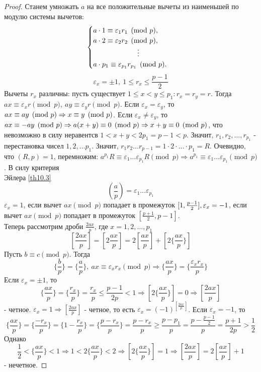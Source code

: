 \documentclass[a4paper, 12pt]{article}
\renewcommand{\epsilon}{\varepsilon}
\newcommand\tab[1][.5cm]{\hspace*{#1}}
\theoremstyle{definition}
\begin{document}
    \begin{proof}
        Станем умножать $a$ на все положительные вычеты из наименьшей по модулю системы вычетов:\\
        \[\begin{cases}
            a\cdot 1\equiv \epsilon_1 r_1\pmod{p},\\
            a\cdot 2\equiv \epsilon_2 r_2\pmod{p},\\
            \tab[2.2cm]\vdots\\
            a\cdot p_1\equiv \epsilon_{p_1} r_{p_1}\pmod{p}.      
        \end{cases}\]
        \[\epsilon_x=\pm 1,\ 1\leq r_x\leq \frac{p-1}{2}\]
        Вычеты $r_x$ различны: пусть существует $1\leq x<y\leq p_1: r_x=r_y=r$. Тогда\\
        $ax\equiv \epsilon_xr\pmod{p},\ ay\equiv \epsilon_yr\pmod{p}$. Если $\epsilon_x=\epsilon_y$, то $ax\equiv ay\pmod{p}\\
        \Rightarrow x\equiv y\pmod{p}$. Если $\epsilon_x\ne \epsilon_y$, то $ax\equiv -ay \pmod{p}\\
        \Rightarrow a(x+y)\equiv 0\pmod{p} \Rightarrow x+y\equiv 0\pmod{p}$, что невозможно в силу неравентсв $1<x+y<2p_1=p-1<p$. Значит, $r_1,r_2,\dots, r_{p_1}$ - перестановка чисел $1,2,\dots p_1$. Значит, $r_1 r_2 \dots r_{p-1}=1\cdot 2\cdot \dots \cdot p_1=R$. Очевидно, что $(R,p)=1$, перемножим: $a^{p_1}R\equiv \epsilon_1\dots \epsilon_{p_1}R\pmod{p} \Rightarrow a^{p_1}\equiv \epsilon_1\dots\epsilon_{p_1}\pmod{p}$. В силу критерия \\
        Эйлера \eqref{th10.3}
        \[(\frac{a}{p})=\epsilon_1\dots\epsilon_{p_1}\]
        $\epsilon_x=1$, если вычет $ax\pmod{p}$ попадает в промежуток $[1,\frac{p-1}{2}],\\
        \epsilon_x=-1$, если вычет $ax\pmod{p}$ попадает в промежуток $[\frac{p+1}{2},p-1]$.\\
        Теперь рассмотрим дроби $\frac{2ax}{p}$, где $x=1,2,\dots, p_1$
        \[[\frac{2ax}{p}]=[2\frac{ax}{p}]=2[\frac{ax}{p}]+[2\{\frac{ax}{p}\}]\]
        Пусть $b\equiv c\pmod{p}$. Тогда 
        \[\{\frac{b}{p}\}=\{\frac{a}{p}\},\ ax\equiv \epsilon_x r_x\pmod{p} \Rightarrow \{\frac{ax}{p}\}=\{\frac{\epsilon_x r_x}{p}\}\]
        Если $\epsilon_x=\pm 1$, то 
        \[\{\frac{ax}{p}\}=\{\frac{r_x}{p}\}=\frac{r_x}{p}\leq \frac{p-1}{2p}<1 \Rightarrow [2\{\frac{ax}{p}\}]=0 \Rightarrow [\frac{2ax}{p}]\]
        - четное. $\epsilon_x=1 \Rightarrow [\frac{2ax}{p}]$ - четное, то есть $\epsilon_x=(-1)^{[\frac{2ax}{p}]}$.
        Если $\epsilon_x=-1$, то 
        \[\{\frac{ax}{p}\}=\{\frac{-r_x}{p}\}=\{1-\frac{r_x}{p}\}=\{\frac{p-r_x}{p}\}=\frac{p-r_x}{p}\geq \frac{p-p_1}{p}=\frac{p-\frac{p-1}{2}}{p}=\frac{p+1}{2p}>\frac{1}{2}\]
        Однако \[\frac{1}{2}<\{\frac{ax}{p}\}<1 \Rightarrow 1<2\{\frac{ax}{p}\}<2 \Rightarrow [2\{\frac{ax}{p}\}]=1 \Rightarrow [\frac{2ax}{p}]=2[\frac{ax}{p}]+1\]
        - нечетное.
    \end{proof} 
\end{document}
